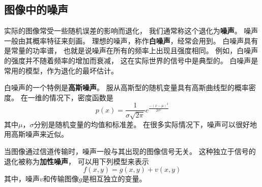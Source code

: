 \subsection{图像中的噪声}
实际的图像常受一些随机误差的影响而退化，%
我们通常称这个退化为\textbf{\color{magenta}噪声}。%
噪声一般由其概率特征来刻画。%
理想的噪声，称作\textbf{\color{magenta}白噪声}，经常会用到。%
白噪声具有是常量的功率谱，%
也就是说噪声在所有的频率上出现且强度相同。%
例如，白噪声的强度并不随着频率的增加而衰减，%
这在实际世界的信号中是典型的。%
白噪声是常用的模型，作为退化的最坏估计。%

白噪声的一个特例是\textbf{\color{magenta}高斯噪声}。%
服从高斯型的随机变量具有高斯曲线型的概率密度。%
在一维的情况下，密度函数是
\begin{equation}
  p(x) = \frac{1}{\sigma\sqrt{2\pi}}e^{\frac{-(x-\mu)^{2}}{2\sigma^{2}}}
\end{equation}
其中$\mu$，$\sigma$分别是随机变量的均值和标准差。%
在很多实际情况下，噪声可以很好地用高斯噪声来近似。

当图像通过信道传输时，噪声一般与其出现的图像信号无关。%
这种独立于信号的退化被称为\textbf{\color{magenta}加性噪声}，%
可以用下列模型来表示
\begin{equation}
  f(x,y)=g(x,y)+v(x,y)
\end{equation}
其中，噪声$v$和传输图像$g$是相互独立的变量。

